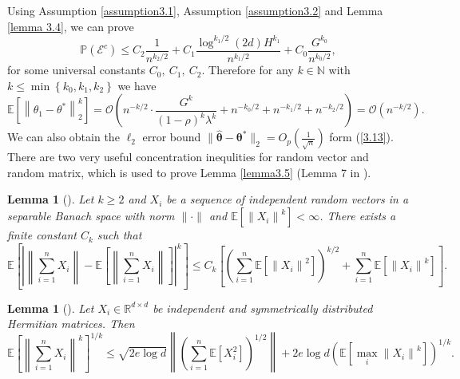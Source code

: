 \documentclass[12pt]{article}
\numberwithin{equation}{section}
\newtheorem{lemma}[theorem]{Lemma}
\begin{document}
Using Assumption \ref{assumption3.1}, Assumption \ref{assumption3.2} and Lemma \ref{lemma 3.4}, we can prove
$$
\mathbb{P}\left(\mathcal{E}^{c}\right)\leq C_{2} \frac{1}{n^{k_{2} / 2}}+C_{1} \frac{\log ^{k_{1} / 2}(2 d) H^{k_{1}}}{n^{k_{1} / 2}}+C_{0} \frac{G^{k_{0}}}{n^{k_{0} / 2}},
$$
for some universal constants $C_0,\ C_1,\ C_2$. Therefore for any $k\in \mathbb{N}$ with $k \leq \min \left\{k_{0}, k_{1}, k_{2}\right\}$ we have
\begin{equation}\label{3.13}
\mathbb{E}\left[\left\|\theta_{1}-\theta^{*}\right\|_{2}^{k}\right]=\mathcal{O}\left(n^{-k / 2} \cdot \frac{G^{k}}{(1-\rho)^{k} \lambda^{k}}+n^{-k_{0} / 2}+n^{-k_{1} / 2}+n^{-k_{2} / 2}\right)=\mathcal{O}\left(n^{-k / 2}\right).
\end{equation}
We can also obtain the $\ell_2$ error bound $\|\widehat{\boldsymbol{\theta}}-\boldsymbol{\theta}^{*}\|_2=O_p\left(\frac{1}{\sqrt{n}}\right)$ form (\ref{3.13}).
There are two very useful concentration inequlities for random vector and random matrix, which is used to prove Lemma \ref{lemma3.5} (Lemma 7 in \citet{zhang2013communication}).
\begin{lemma}[\citet{de1981inequalities}]
	Let $k\geq 2$ and $X_i$ be a sequence of independent random vectors in a separable Banach space with norm $\|\cdot\|$ and $\mathbb{E}\left[\left\|X_{i}\right\|^{k}\right]<\infty$. There exists a finite constant $C_k$ such that
	\begin{equation}
	\mathbb{E}\left[\left|\left\|\sum_{i=1}^{n} X_{i}\right\|-\mathbb{E}\left[\left\|\sum_{i=1}^{n} X_{i}\right\|\right]\right|^{k}\right]\leq C_{k}\left[\left(\sum_{i=1}^{n} \mathbb{E}\left[\left\|X_{i}\right\|^{2}\right]\right)^{k / 2}+\sum_{i=1}^{n} \mathbb{E}\left[\left\|X_{i}\right\|^{k}\right]\right].
	\end{equation}
\end{lemma}
\begin{lemma}[\citet{chen2012masked}]
	Let $X_i \in \mathbb{R}^{d\times d}$ be independent and symmetrically distributed Hermitian matrices. Then
	\begin{equation}
	\mathbb{E}\left[\left\|\sum_{i=1}^{n} X_{i}\right\|^{k}\right]^{1 / k} \leq \sqrt{2 e \log d}\left\|\left(\sum_{i=1}^{n} \mathbb{E}\left[X_{i}^{2}\right]\right)^{1 / 2}\right\|+2 e \log d\left(\mathbb{E}\left[\max _{i}\left\|X_{i}\right\|^{k}\right]\right)^{1 / k}.
	\end{equation}
\end{lemma}
\end{document}
